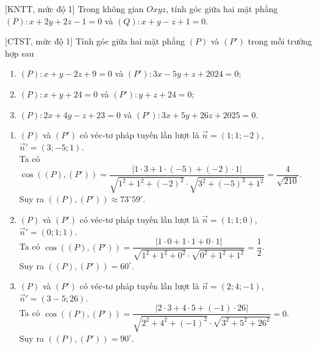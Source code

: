 \begin{bt}%
[KNTT, mức độ 1]%
	Trong không gian $Oxyz$, tính góc giữa hai mặt phẳng $(P)\colon x+2y+2z-1=0$ và $(Q)\colon x+y-z+1=0$.
\end{bt}

\begin{bt}%
[CTST, mức độ 1]%
	Tính góc giữa hai mặt phẳng $(P)$ và $(P')$ trong mỗi trường hợp sau
	\begin{enumerate}
		\item $(P)\colon x+y-2z+9=0$ và $(P')\colon 3x-5y+z+2024=0$;
		\item $(P)\colon x+y+24=0$ và $(P')\colon y+z+24=0$;
		\item $(P)\colon 2x+4y-z+23=0$ và $(P')\colon 3x+5y+26z+2025=0$.
	\end{enumerate}
	\loigiai
	{
		\begin{enumerate}
			\item $(P)$ và $(P')$ có véc-tơ pháp tuyến lần lượt là $\overrightarrow{n}=(1;1;-2)$, $\overrightarrow{n}'=(3;-5;1)$.\\
			Ta có $\cos\left ((P),(P') \right )=\dfrac{\left |1\cdot 3+1\cdot (-5)+(-2)\cdot 1 \right |}{\sqrt{1^2+1^2+(-2)^2}\cdot\sqrt{3^2+(-5)^2+1^2}}=\dfrac{4}{\sqrt{210}}$.\\
			Suy ra $((P),(P'))\approx 73^{\circ}59'$.
			\item $(P)$ và $(P')$ có véc-tơ pháp tuyến lần lượt là $\overrightarrow{n}=(1;1;0)$, $\overrightarrow{n}'=(0;1;1)$.\\
			Ta có $\cos\left ((P),(P') \right )=\dfrac{\left |1\cdot 0+1\cdot 1+0\cdot 1 \right |}{\sqrt{1^2+1^2+0^2}\cdot\sqrt{0^2+1^2+1^2}}=\dfrac{1}{2}$.\\
			Suy ra $((P),(P'))=60^{\circ}$.
			\item $(P)$ và $(P')$ có véc-tơ pháp tuyến lần lượt là $\overrightarrow{n}=(2;4;-1)$, $\overrightarrow{n}'=(3-5;26)$.\\
			Ta có $\cos\left ((P),(P') \right )=\dfrac{\left |2\cdot 3+4\cdot 5+(-1)\cdot 26 \right |}{\sqrt{2^2+4^2+(-1)^2}\cdot\sqrt{3^2+5^2+26^2}}=0$.\\
			Suy ra $((P),(P'))=90^{\circ}$.
		\end{enumerate}
	}
\end{bt}

